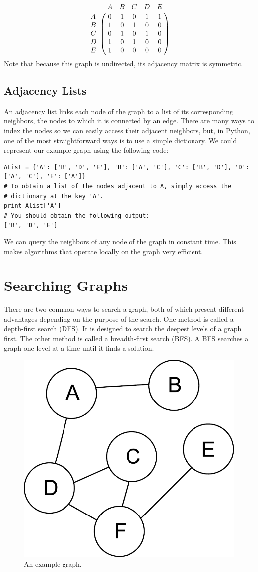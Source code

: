 \[
\bordermatrix{\hspace{.4cm}&A&B&C&D&E\cr
                A&0 & 1 & 0 & 1 & 1\cr
                B& 1 & 0 & 1 & 0 & 0\cr
                C& 0 & 1 & 0 & 1 & 0\cr
                D& 1 & 0 & 1 & 0 & 0\cr
                E& 1 & 0 & 0 & 0 & 0}\]
Note that because this graph is undirected, its adjacency matrix is symmetric.

\subsection*{Adjacency Lists}
An adjacency list links each node of the graph to a list of its corresponding neighbors, the nodes to which it is connected by an edge.
There are many ways to index the nodes so we can easily access their adjacent neighbors, but, in Python, one of the most straightforward ways is to use a simple dictionary.
We could represent our example graph using the following code:
\begin{lstlisting}
AList = {'A': ['B', 'D', 'E'], 'B': ['A', 'C'], 'C': ['B', 'D'], 'D': ['A', 'C'], 'E': ['A']}
# To obtain a list of the nodes adjacent to A, simply access the
# dictionary at the key 'A'.
print Alist['A']
# You should obtain the following output:
['B', 'D', 'E']
\end{lstlisting}
We can query the neighbors of any node of the graph in constant time.
This makes algorithms that operate locally on the graph very efficient.

\section*{Searching Graphs}
There are two common ways to search a graph, both of which present different advantages depending on the purpose of the search.
One method is called a depth-first search (DFS).  It is designed to search the deepest levels of a graph first.
The other method is called a breadth-first search (BFS).  A BFS searches a graph one level at a time until it finds a solution.
\begin{figure}[h]
\centering
\includegraphics[width=.5\textwidth]{graph.pdf}
\caption{An example graph.}
\label{fig:bfs_dfs_graph}
\end{figure}


